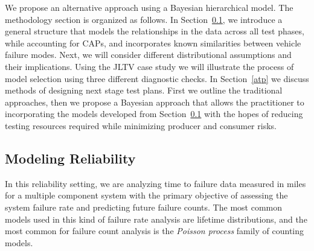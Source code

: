 \documentclass[12pt]{article}
\begin{document}
We propose an alternative approach using a Bayesian hierarchical
model.  The methodology section is organized as follows.  In Section~\ref{modrel}, we introduce a general structure that models the relationships in the
data across all test phases, while accounting for CAPs, and incorporates known
similarities between vehicle failure modes.  Next, we will consider different
distributional assumptions and their implications.  Using the JLTV case study we
will illustrate the process of model selection using three different diagnostic
checks.  In Section~\ref{atp} we discuss methods of designing next stage test plans.
First we outline the traditional approaches, then we propose a Bayesian
approach that allows the practitioner to incorporating the models developed from
Section~\ref{modrel} with the hopes of reducing testing resources required while minimizing producer and consumer risks.

\subsection{Modeling Reliability}\label{modrel}
In this reliability setting, we are analyzing time to failure data measured in
miles for a multiple component system with the primary objective of
assessing the system failure rate and predicting future failure counts.
The most common models used in this kind of failure rate analysis are lifetime
distributions, and the most common for failure count analysis is the
\emph{Poisson process} family of counting models.
\end{document}
